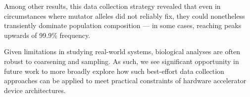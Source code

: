 Among other results, this data collection strategy revealed that even in circumstances where mutator alleles did not reliably fix, they could nonetheless transiently dominate population composition --- in some cases, reaching peaks upwards of 99.9\% frequency.

Given limitations in studying real-world systems, biological analyses are often robust to coarsening and sampling.
As such, we see significant opportunity in future work to more broadly explore how such best-effort data collection approaches can be applied to meet practical constraints of hardware accelerator device architectures.

